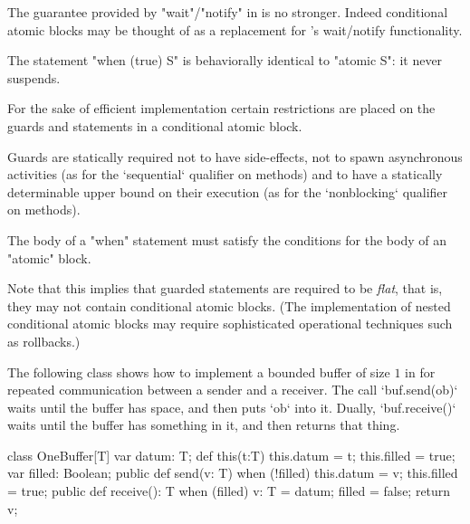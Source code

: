 \begin{rationale}
The guarantee provided by \xcd"wait"/\xcd"notify" in \java{} is no
stronger. Indeed conditional atomic blocks may be thought of as a
replacement for \java's wait/notify functionality.
\end{rationale} 


The statement \xcd"when (true) S" is
behaviorally identical to \xcd"atomic S": it never suspends.

\begin{staticrule*}
For the sake of efficient implementation certain restrictions are
placed on the guards and statements in a conditional atomic
block. 
\end{staticrule*}

Guards are statically required not to have side-effects, not to spawn
asynchronous activities (as for the \xcd`sequential` qualifier on methods) and
to have a statically determinable upper bound on their execution (as for the
\xcd`nonblocking` qualifier on methods).

The body of a \xcd"when" statement must satisfy the conditions
for the body of an \xcd"atomic" block.

Note that this implies that guarded statements are required to be {\em
flat}, that is, they may not contain conditional atomic blocks. (The
implementation of nested conditional atomic blocks may require
sophisticated operational techniques such as rollbacks.)


\begin{example}
The following class shows how to implement a bounded buffer of size
$1$ in \Xten{} for repeated communication between a sender and a
receiver.  The call \xcd`buf.send(ob)` waits until the buffer has space, and
then puts \xcd`ob` into it.  Dually, \xcd`buf.receive()` waits until the
buffer has something in it, and then returns that thing.


\begin{xten}
class OneBuffer[T] {
  var datum: T;
  def this(t:T) { this.datum = t; this.filled = true; }
  var filled: Boolean;
  public def send(v: T) {
    when (!filled) {
      this.datum = v;
      this.filled = true;
    }
  }
  public def receive(): T {
    when (filled) {
      v: T = datum;
      filled = false;
      return v;
    }
  }
}
\end{xten}
%
\end{example}

